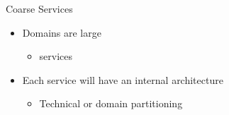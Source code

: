 \documentclass{slide}
\begin{document}

\begin{frame}{Coarse Services}
    \vspace{1mm}
    {\LARGE
    \begin{itemize}
        \item Domains are large
        \begin{itemize}
            \Large\item {} services
        \end{itemize}
        \vspace{2mm}
        \item Each service will have an internal architecture
        \begin{itemize}
            \Large\item Technical or domain partitioning
        \end{itemize}
    \end{itemize}
    }
\end{frame}
\end{document}
